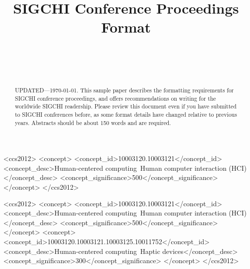 \documentclass{sigchi}
\def\plaintitle{SIGCHI Conference Proceedings Format}
\begin{document}
\title{\plaintitle}

\author{%
  \\
  \\
  \\
}

\maketitle

\begin{abstract}
  UPDATED---\today. This sample paper describes the formatting
  requirements for SIGCHI conference proceedings, and offers
  recommendations on writing for the worldwide SIGCHI
  readership. Please review this document even if you have submitted
  to SIGCHI conferences before, as some format details have changed
  relative to previous years. Abstracts should be about 150 words and
  are required.
\end{abstract}



\begin{CCSXML}
<ccs2012>
<concept>
<concept_id>10003120.10003121</concept_id>
<concept_desc>Human-centered computing~Human computer interaction (HCI)</concept_desc>
<concept_significance>500</concept_significance>
</concept>
</ccs2012>
\end{CCSXML}


\begin{CCSXML}
<ccs2012>
<concept>
<concept_id>10003120.10003121</concept_id>
<concept_desc>Human-centered computing~Human computer interaction (HCI)</concept_desc>
<concept_significance>500</concept_significance>
</concept>
<concept>
<concept_id>10003120.10003121.10003125.10011752</concept_id>
<concept_desc>Human-centered computing~Haptic devices</concept_desc>
<concept_significance>300</concept_significance>
</concept>
</ccs2012>
\end{CCSXML}
\end{document}
